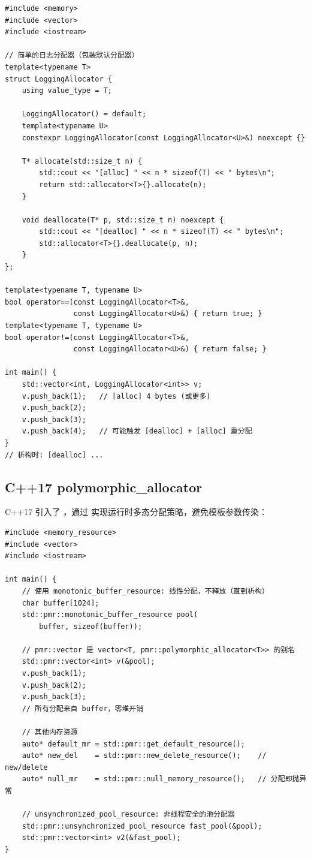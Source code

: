 \documentclass[12pt,a4paper,fontset=fandol]{ctexbook}
\newcommand{\cpp}[1]{C++#1}
\newcommand{\Tp}[1]{\texttt{#1}}
\begin{document}
\begin{lstlisting}
#include <memory>
#include <vector>
#include <iostream>

// 简单的日志分配器（包装默认分配器）
template<typename T>
struct LoggingAllocator {
    using value_type = T;

    LoggingAllocator() = default;
    template<typename U>
    constexpr LoggingAllocator(const LoggingAllocator<U>&) noexcept {}

    T* allocate(std::size_t n) {
        std::cout << "[alloc] " << n * sizeof(T) << " bytes\n";
        return std::allocator<T>{}.allocate(n);
    }

    void deallocate(T* p, std::size_t n) noexcept {
        std::cout << "[dealloc] " << n * sizeof(T) << " bytes\n";
        std::allocator<T>{}.deallocate(p, n);
    }
};

template<typename T, typename U>
bool operator==(const LoggingAllocator<T>&,
                const LoggingAllocator<U>&) { return true; }
template<typename T, typename U>
bool operator!=(const LoggingAllocator<T>&,
                const LoggingAllocator<U>&) { return false; }

int main() {
    std::vector<int, LoggingAllocator<int>> v;
    v.push_back(1);   // [alloc] 4 bytes (或更多)
    v.push_back(2);
    v.push_back(3);
    v.push_back(4);   // 可能触发 [dealloc] + [alloc] 重分配
}
// 析构时: [dealloc] ...
\end{lstlisting}

\subsection{C++17 polymorphic\_allocator}

\cpp{17} 引入了 \Tp{}，通过
\Tp{} 实现运行时多态分配策略，避免模板参数传染：

\begin{lstlisting}
#include <memory_resource>
#include <vector>
#include <iostream>

int main() {
    // 使用 monotonic_buffer_resource: 线性分配，不释放（直到析构）
    char buffer[1024];
    std::pmr::monotonic_buffer_resource pool(
        buffer, sizeof(buffer));

    // pmr::vector 是 vector<T, pmr::polymorphic_allocator<T>> 的别名
    std::pmr::vector<int> v(&pool);
    v.push_back(1);
    v.push_back(2);
    v.push_back(3);
    // 所有分配来自 buffer，零堆开销

    // 其他内存资源
    auto* default_mr = std::pmr::get_default_resource();
    auto* new_del    = std::pmr::new_delete_resource();    // new/delete
    auto* null_mr    = std::pmr::null_memory_resource();   // 分配即抛异常

    // unsynchronized_pool_resource: 非线程安全的池分配器
    std::pmr::unsynchronized_pool_resource fast_pool(&pool);
    std::pmr::vector<int> v2(&fast_pool);
}
\end{lstlisting}
\end{document}
